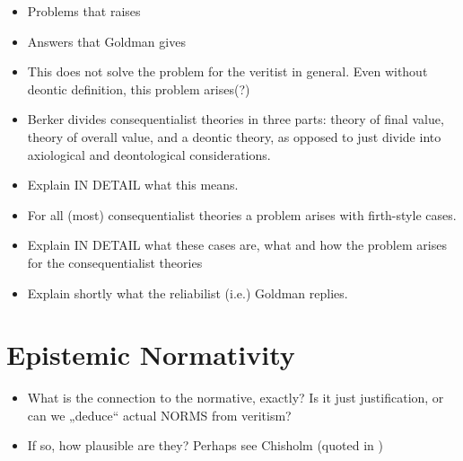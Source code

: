 \documentclass[12pt,numbers=noenddot]{scrartcl}
\begin{document}
\begin{itemize}
    \item Problems that \textcite{Berker2013-BERETA-2} raises
    \item Answers that Goldman gives
    \item This does not solve the problem for the veritist in general. Even without deontic definition, this problem arises(?)
    \item Berker divides consequentialist theories in three parts: theory of final value, theory of overall value, and a deontic theory, as opposed to just divide into axiological and deontological considerations. 
    \item Explain IN DETAIL what this means. 
    \item For all (most) consequentialist theories a problem arises with firth-style cases. 
    \item Explain IN DETAIL what these cases are, what and how the problem arises for the consequentialist theories
    \item Explain shortly what the reliabilist (i.e.) Goldman replies.  
\end{itemize}

\section{Epistemic Normativity}

\begin{itemize}
    \item What is the connection to the normative, exactly? Is it just justification, or can we „deduce“ actual NORMS from veritism? 
    \item If so, how plausible are they? Perhaps see Chisholm (quoted in \textcite{Goldman2002-GOLTUO-2})
\end{itemize}
\end{document}
